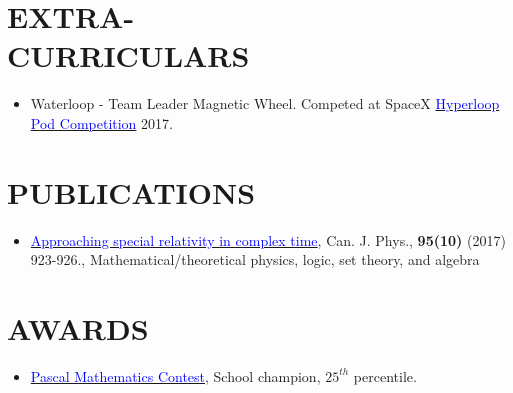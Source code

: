 \documentclass[margin]{res}
\begin{document}
\begin{resume}
	\section{\textcolor{NavyBlue}{EXTRA- \\ CURRICULARS}}
	\begin{itemize} \itemsep -2pt %
		\item Waterloop - Team Leader Magnetic Wheel. Competed at SpaceX \href{https://en.wikipedia.org/wiki/Hyperloop_pod_competition}{\textcolor{blue}{Hyperloop Pod Competition}} 2017.
	\end{itemize}

	\section{\textcolor{NavyBlue}{PUBLICATIONS}}
	\begin{itemize}
		\item \href{https://www.nrcresearchpress.com/doi/abs/10.1139/cjp-2017-0089?journalCode=cjp#.X3Z1_GhKiUk}{\textcolor{blue}{Approaching special relativity in complex time}}, Can. J. Phys., \textbf{95(10)} (2017) 923-926., Mathematical/theoretical physics, logic, set theory, and algebra
	\end{itemize}

	\section{\textcolor{NavyBlue}{AWARDS}}
	\begin{itemize}
		\item 	\href{https://www.cemc.uwaterloo.ca/contests/pcf.html}{\textcolor{blue}{Pascal Mathematics Contest}}, School champion, $25^{th}$ percentile.
	\end{itemize}
\end{resume}
\end{document}

